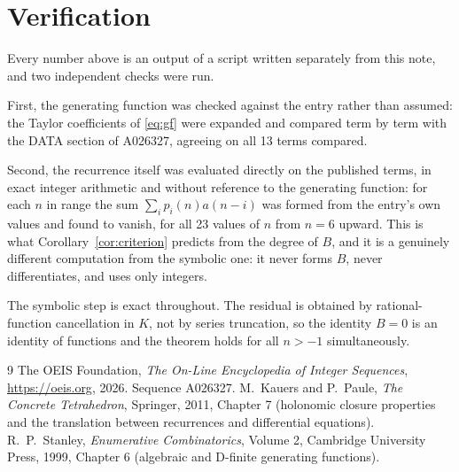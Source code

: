 \documentclass[11pt,a4paper]{article}
\theoremstyle{plain}
\theoremstyle{definition}
\begin{document}
\section{Verification}

Every number above is an output of a script written separately from this note, and two
independent checks were run.

First, the generating function was checked against the entry rather than assumed: the
Taylor coefficients of \eqref{eq:gf} were expanded and compared term by term with the DATA
section of A026327, agreeing on all 13 terms compared.

Second, the recurrence itself was evaluated directly on the published terms, in exact
integer arithmetic and without reference to the generating function: for each $n$ in range
the sum $\sum_{i}p_{i}(n)a(n-i)$ was formed from the entry's own values and found to
vanish, for all 23 values of $n$ from $n=6$ upward. This is what
Corollary~\ref{cor:criterion} predicts from the degree of $B$, and it is a genuinely
different computation from the symbolic one: it never forms $B$, never differentiates, and
uses only integers.

The symbolic step is exact throughout. The residual is obtained by rational-function
cancellation in $K$, not by series truncation, so the identity $B=0$ is an
identity of functions and the theorem holds for all $n>-1$ simultaneously.

\begin{thebibliography}{9}
 The OEIS Foundation, \emph{The On-Line Encyclopedia of Integer Sequences},
\url{https://oeis.org}, 2026. Sequence A026327.
 M.~Kauers and P.~Paule, \emph{The Concrete Tetrahedron}, Springer, 2011,
Chapter 7 (holonomic closure properties and the translation between recurrences and
differential equations).
 R.~P.~Stanley, \emph{Enumerative Combinatorics}, Volume 2, Cambridge
University Press, 1999, Chapter 6 (algebraic and D-finite generating functions).
\end{thebibliography}
\end{document}
